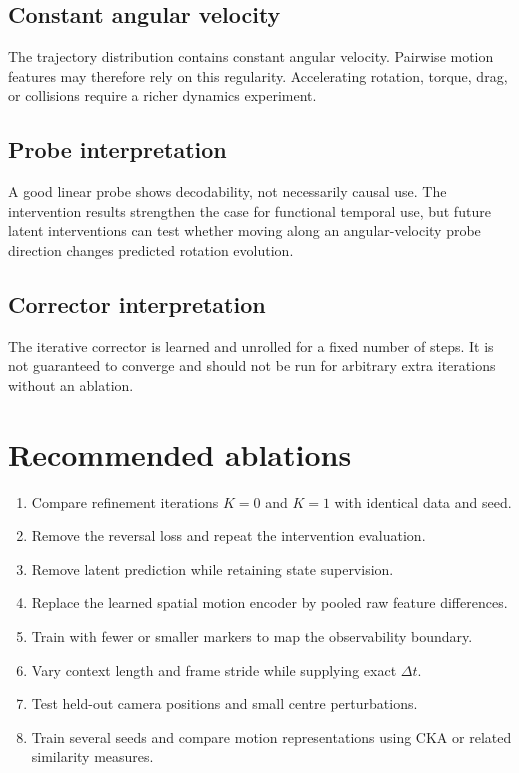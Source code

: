 \documentclass[11pt,a4paper]{article}
\begin{document}
\subsection{Constant angular velocity}
The trajectory distribution contains constant angular velocity. Pairwise motion features may therefore rely on this regularity. Accelerating rotation, torque, drag, or collisions require a richer dynamics experiment.

\subsection{Probe interpretation}
A good linear probe shows decodability, not necessarily causal use. The intervention results strengthen the case for functional temporal use, but future latent interventions can test whether moving along an angular-velocity probe direction changes predicted rotation evolution.

\subsection{Corrector interpretation}
The iterative corrector is learned and unrolled for a fixed number of steps. It is not guaranteed to converge and should not be run for arbitrary extra iterations without an ablation.

\section{Recommended ablations}
\begin{enumerate}[leftmargin=*]
\item Compare refinement iterations $K=0$ and $K=1$ with identical data and seed.
\item Remove the reversal loss and repeat the intervention evaluation.
\item Remove latent prediction while retaining state supervision.
\item Replace the learned spatial motion encoder by pooled raw feature differences.
\item Train with fewer or smaller markers to map the observability boundary.
\item Vary context length and frame stride while supplying exact $\Delta t$.
\item Test held-out camera positions and small centre perturbations.
\item Train several seeds and compare motion representations using CKA or related similarity measures.
\end{enumerate}
\end{document}
